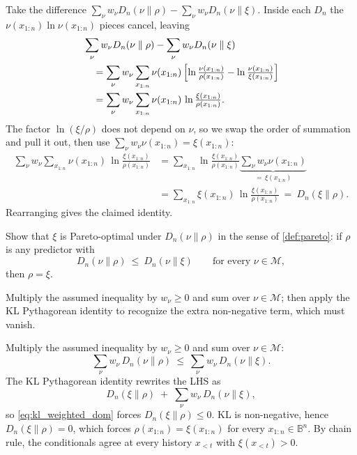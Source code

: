 \documentclass[fontsize=11pt, parskip=half]{scrartcl}
\newcommand{\Mc}{\mathcal{M}}
\begin{document}
\begin{solution}
Take the difference $\sum_\nu w_\nu D_n(\nu \parallel \rho) - \sum_\nu w_\nu D_n(\nu \parallel \xi)$.
Inside each $D_n$ the $\nu(x_{1:n}) \ln \nu(x_{1:n})$ pieces cancel, leaving
\begin{align*}
&\sum_\nu w_\nu D_n(\nu \parallel \rho) - \sum_\nu w_\nu D_n(\nu \parallel \xi) \\
&\quad= \sum_\nu w_\nu \sum_{x_{1:n}}
   \nu(x_{1:n})\,\Bigl[\ln\tfrac{\nu(x_{1:n})}{\rho(x_{1:n})}
                  - \ln\tfrac{\nu(x_{1:n})}{\xi(x_{1:n})}\Bigr] \\
&\quad= \sum_\nu w_\nu \sum_{x_{1:n}}
   \nu(x_{1:n})\,\ln \tfrac{\xi(x_{1:n})}{\rho(x_{1:n})}.
\end{align*}
The factor $\ln(\xi/\rho)$ does not depend on $\nu$, so we swap the order of
summation and pull it out, then use $\sum_\nu w_\nu \nu(x_{1:n}) = \xi(x_{1:n})$:
\begin{align*}
\sum_\nu w_\nu \sum_{x_{1:n}}
   \nu(x_{1:n})\,\ln \tfrac{\xi(x_{1:n})}{\rho(x_{1:n})}
&= \sum_{x_{1:n}} \ln \tfrac{\xi(x_{1:n})}{\rho(x_{1:n})}
   \underbrace{\sum_\nu w_\nu \nu(x_{1:n})}_{=\, \xi(x_{1:n})} \\
&= \sum_{x_{1:n}} \xi(x_{1:n}) \,\ln \tfrac{\xi(x_{1:n})}{\rho(x_{1:n})}
~=~ D_n(\xi \parallel \rho).
\end{align*}
Rearranging gives the claimed identity. \qedhere
\end{solution}

\begin{exercise}
\label{prob:kl_pareto}



Show that $\xi$ is Pareto-optimal under $D_n(\nu \parallel \rho)$ in the sense of \cref{def:pareto}: if $\rho$ is any predictor with
\[
  D_n(\nu \parallel \rho) ~\leq~ D_n(\nu \parallel \xi) \qquad \text{for every } \nu \in \Mc,
\]
then $\rho = \xi$.

\begin{hint}
Multiply the assumed inequality by $w_\nu \geq 0$ and sum over
$\nu \in \Mc$; then apply the KL Pythagorean identity to recognize the extra
non-negative term, which must vanish.
\end{hint}
\end{exercise}

\begin{solution}
Multiply the assumed inequality by $w_\nu \geq 0$ and sum over $\nu \in \Mc$:
\begin{equation}\label{eq:kl_weighted_dom}
  \sum_\nu w_\nu\, D_n(\nu \parallel \rho) ~\leq~ \sum_\nu w_\nu\, D_n(\nu \parallel \xi).
\end{equation}
The KL Pythagorean identity rewrites the LHS as
\[
  D_n(\xi \parallel \rho) \;+\; \sum_\nu w_\nu\, D_n(\nu \parallel \xi),
\]
so \cref{eq:kl_weighted_dom} forces $D_n(\xi \parallel \rho) \leq 0$. KL is non-negative, hence $D_n(\xi \parallel \rho) = 0$, which forces $\rho(x_{1:n}) = \xi(x_{1:n})$ for every $x_{1:n} \in \mathbb{B}^n$. By chain rule, the conditionals agree at every history $x_{<t}$ with $\xi(x_{<t}) > 0$. \qedhere
\end{solution}
\end{document}
